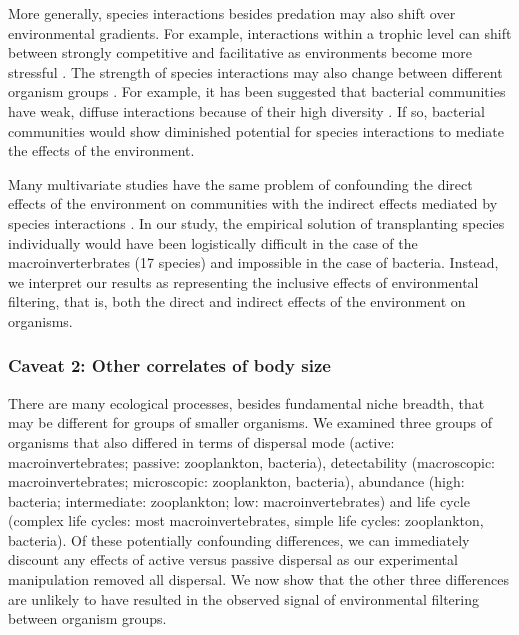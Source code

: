 More generally, species interactions besides predation may also shift
over environmental gradients. For example, interactions within a trophic
level can shift between strongly competitive and facilitative as
environments become more stressful \citep{He2014a}. The strength of
species interactions may also change between different organism groups
\citep{Soininen2013}. For example, it has been suggested that bacterial
communities have weak, diffuse interactions because of their high
diversity \citep{Wang}. If so, bacterial communities would show
diminished potential for species interactions to mediate the effects of
the environment.

Many multivariate studies have the same problem of confounding the
direct effects of the environment on communities with the indirect
effects mediated by species interactions \citep{Vellend2014}. In our
study, the empirical solution of transplanting species individually
would have been logistically difficult in the case of the
macroinverterbrates (17 species) and impossible in the case of bacteria.
Instead, we interpret our results as representing the inclusive effects
of environmental filtering, that is, both the direct and indirect
effects of the environment on organisms.

\subsubsection{Caveat 2: Other correlates of body
size}\label{caveat-2-other-correlates-of-body-size}

There are many ecological processes, besides fundamental niche breadth,
that may be different for groups of smaller organisms. We examined three
groups of organisms that also differed in terms of dispersal mode
(active: macroinvertebrates; passive: zooplankton, bacteria),
detectability (macroscopic: macroinvertebrates; microscopic:
zooplankton, bacteria), abundance (high: bacteria; intermediate:
zooplankton; low: macroinvertebrates) and life cycle (complex life
cycles: most macroinvertebrates, simple life cycles: zooplankton,
bacteria). Of these potentially confounding differences, we can
immediately discount any effects of active versus passive dispersal as
our experimental manipulation removed all dispersal. We now show that
the other three differences are unlikely to have resulted in the
observed signal of environmental filtering between organism groups.

